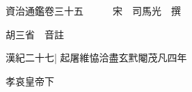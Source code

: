 






























































資治通鑑卷三十五　　　宋　司馬光　撰

胡三省　音註

漢紀二十七|{
	起屠維恊洽盡玄黓閹茂凡四年}


孝哀皇帝下

